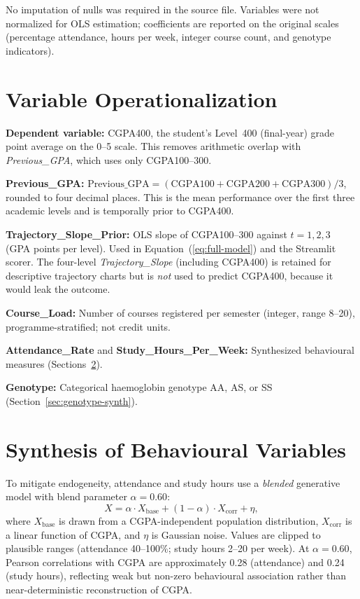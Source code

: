 \documentclass[12pt]{report}
\begin{document}
	No imputation of nulls was required in the source file. Variables were not normalized for OLS estimation; coefficients are reported on the original scales (percentage attendance, hours per week, integer course count, and genotype indicators).
	
	\section{Variable Operationalization}
	\label{sec:operationalization}
	\textbf{Dependent variable:} CGPA400, the student's Level~400 (final-year) grade point average on the 0--5 scale. This removes arithmetic overlap with \textit{Previous\_GPA}, which uses only CGPA100--300.
	
	\textbf{Previous\_GPA:} $\text{Previous\_GPA} = (\text{CGPA100} + \text{CGPA200} + \text{CGPA300})/3$, rounded to four decimal places. This is the mean performance over the first three academic levels and is temporally prior to CGPA400.
	
	\textbf{Trajectory\_Slope\_Prior:} OLS slope of CGPA100--300 against $t = 1, 2, 3$ (GPA points per level). Used in Equation~(\ref{eq:full-model}) and the Streamlit scorer. The four-level \textit{Trajectory\_Slope} (including CGPA400) is retained for descriptive trajectory charts but is \textit{not} used to predict CGPA400, because it would leak the outcome.
	
	\textbf{Course\_Load:} Number of courses registered per semester (integer, range 8--20), programme-stratified; not credit units.
	
	\textbf{Attendance\_Rate} and \textbf{Study\_Hours\_Per\_Week:} Synthesized behavioural measures (Sections~\ref{sec:synthesis}).
	
	\textbf{Genotype:} Categorical haemoglobin genotype AA, AS, or SS (Section~\ref{sec:genotype-synth}).
	
	\section{Synthesis of Behavioural Variables}
	\label{sec:synthesis}
	To mitigate endogeneity, attendance and study hours use a \textit{blended} generative model with blend parameter $\alpha = 0.60$:
	\begin{equation}
		X = \alpha \cdot X_{\text{base}} + (1 - \alpha) \cdot X_{\text{corr}} + \eta,
	\end{equation}
	where $X_{\text{base}}$ is drawn from a CGPA-independent population distribution, $X_{\text{corr}}$ is a linear function of CGPA, and $\eta$ is Gaussian noise. Values are clipped to plausible ranges (attendance 40--100\%; study hours 2--20 per week). At $\alpha = 0.60$, Pearson correlations with CGPA are approximately 0.28 (attendance) and 0.24 (study hours), reflecting weak but non-zero behavioural association rather than near-deterministic reconstruction of CGPA.
	
\end{document}
